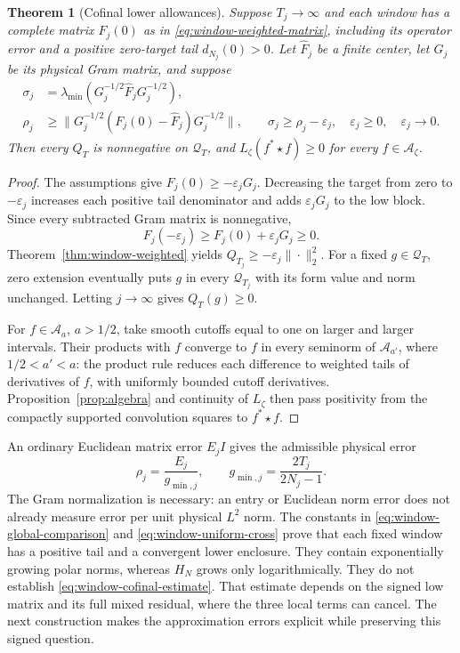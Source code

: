 \documentclass[11pt]{article}
\newtheorem{theorem}{Theorem}[section]
\theoremstyle{definition}
\theoremstyle{remark}
\numberwithin{equation}{section}
\newcommand{\cA}{\mathcal A}
\newcommand{\A}{\mathcal A}
\begin{document}
\begin{theorem}[Cofinal lower allowances]
\label{thm:window-cofinal}
Suppose $T_j\to\infty$ and each window has a complete matrix
$F_j(0)$ as in \eqref{eq:window-weighted-matrix}, including its
operator error and a positive zero-target tail $d_{N_j}(0)>0$.
Let $\widehat F_j$ be a finite center, let $G_j$ be its physical
Gram matrix, and suppose
\begin{align}
 \sigma_j&=\lambda_{\min}
       (G_j^{-1/2}\widehat F_jG_j^{-1/2}),\nonumber\\
 \rho_j&\ge\|G_j^{-1/2}(F_j(0)-\widehat F_j)G_j^{-1/2}\|,
 \qquad \sigma_j\ge\rho_j-\varepsilon_j,
 \quad \varepsilon_j\ge0,\quad\varepsilon_j\longrightarrow0.
 \label{eq:window-cofinal-estimate}
\end{align}
Then every $Q_T$ is nonnegative on $\mathcal Q_T$, and
$L_\zeta(f^*\star f)\ge0$ for every $f\in\cA_\zeta$.
\end{theorem}
\begin{proof}
The assumptions give $F_j(0)\ge-\varepsilon_jG_j$.
Decreasing the target from zero to $-\varepsilon_j$ increases
each positive tail denominator and adds $\varepsilon_jG_j$ to
the low block.  Since every subtracted Gram matrix is nonnegative,
\[
 F_j(-\varepsilon_j)\ge F_j(0)+\varepsilon_jG_j\ge0.
\]
Theorem~\ref{thm:window-weighted} yields
$Q_{T_j}\ge-\varepsilon_j\|\cdot\|_2^2$.
For a fixed $g\in\mathcal Q_T$, zero extension eventually puts
$g$ in every $\mathcal Q_{T_j}$ with its form value and norm
unchanged.  Letting $j\to\infty$ gives $Q_T(g)\ge0$.

For $f\in\A_a$, $a>1/2$, take smooth cutoffs equal to one on
larger and larger intervals.  Their products with $f$ converge
to $f$ in every seminorm of $\A_{a'}$, where
$1/2<a'<a$: the product rule reduces each difference to weighted
tails of derivatives of $f$, with uniformly bounded cutoff
derivatives.  Proposition~\ref{prop:algebra} and continuity of
$L_\zeta$ then pass positivity from the compactly supported
convolution squares to $f^*\star f$.
\end{proof}

An ordinary Euclidean matrix error $E_jI$ gives the admissible
physical error
\begin{equation}
 \rho_j=\frac{E_j}{g_{\min,j}},\qquad
 g_{\min,j}=\frac{2T_j}{2N_j-1}.
 \label{eq:window-physical-error}
\end{equation}
The Gram normalization is necessary: an entry or Euclidean norm
error does not already measure error per unit physical $L^2$ norm.
The constants in \eqref{eq:window-global-comparison} and
\eqref{eq:window-uniform-cross} prove that each fixed window has
a positive tail and a convergent lower enclosure.  They contain
exponentially growing polar norms, whereas $H_N$ grows only
logarithmically.  They do not establish
\eqref{eq:window-cofinal-estimate}.  That estimate depends on the
signed low matrix and its full mixed residual, where the three
local terms can cancel.  The next construction makes the approximation
errors explicit while preserving this signed question.
\end{document}
